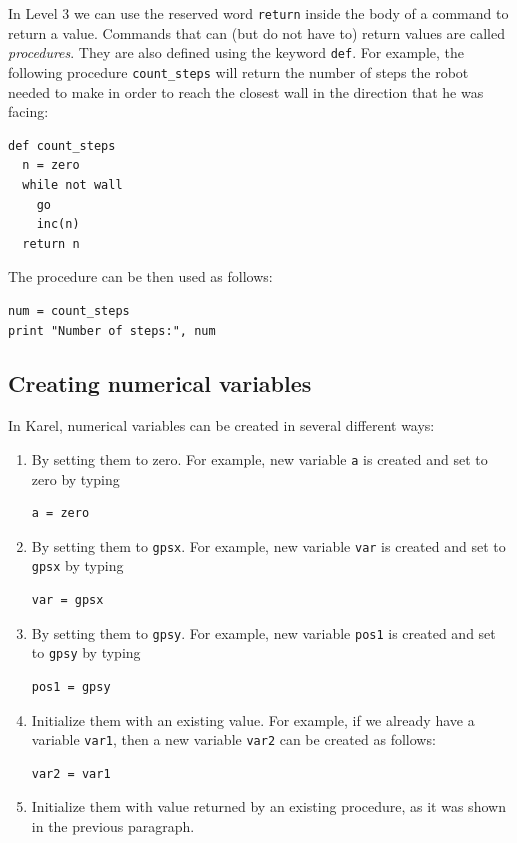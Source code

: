 \documentclass[article,A4,12pt]{llncs}
\begin{document}
{{{{In Level 3 we can use the reserved word {\tt return} inside the body of
a command to return a value. Commands that can (but do not have to) 
return values are called {\em procedures}. They are also defined using the 
keyword {\tt def}. For example, the following procedure
{\tt count\_steps} will return the number of steps the robot needed to 
make in order to reach the closest wall in the direction that he was facing:

\begin{verbatim}
def count_steps
  n = zero
  while not wall
    go
    inc(n)
  return n
\end{verbatim}
The procedure can be then used as follows:

\begin{verbatim}
num = count_steps
print "Number of steps:", num 
\end{verbatim}

\subsection{Creating numerical variables}

In Karel, numerical variables can be created in several different ways: 
\begin{enumerate}
\item By setting them to zero. For example, new variable {\tt a} is created and set to zero by typing 
\begin{verbatim}
a = zero
\end{verbatim}
\item By setting them to {\tt gpsx}. For example, new variable {\tt var} is created and set to {\tt gpsx} by typing
\begin{verbatim}
var = gpsx
\end{verbatim}
\item By setting them to {\tt gpsy}. For example, new variable {\tt pos1} is created and set to {\tt gpsy} by typing
\begin{verbatim}
pos1 = gpsy
\end{verbatim}
\item Initialize them with an existing value. For example, if we already have a variable {\tt var1}, then a new variable 
{\tt var2} can be created as follows:
\begin{verbatim}
var2 = var1
\end{verbatim}
\item Initialize them with value returned by an existing procedure, as it was shown in the previous 
paragraph. 
\end{enumerate}

}}}}
\end{document}
